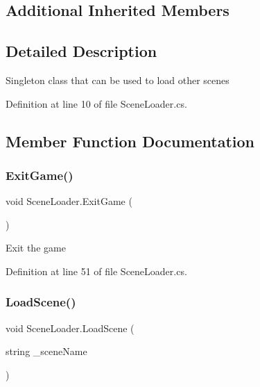 \subsection*{Additional Inherited Members}


\subsection{Detailed Description}
Singleton class that can be used to load other scenes 



Definition at line 10 of file Scene\+Loader.\+cs.



\subsection{Member Function Documentation}
\mbox{\label{class_scene_loader_a0e53114fa65d1ef71d1c6af0bcb4fde5}} 
\subsubsection{\texorpdfstring{Exit\+Game()}{ExitGame()}}
{\footnotesize\ttfamily void Scene\+Loader.\+Exit\+Game (\begin{DoxyParamCaption}{ }\end{DoxyParamCaption})}



Exit the game 



Definition at line 51 of file Scene\+Loader.\+cs.

\mbox{\label{class_scene_loader_a163293de6da9b9a1fd0f0814dec77973}} 
\subsubsection{\texorpdfstring{Load\+Scene()}{LoadScene()}\hspace{0.1cm}{\footnotesize\ttfamily [1/2]}}
{\footnotesize\ttfamily void Scene\+Loader.\+Load\+Scene (\begin{DoxyParamCaption}\item[{string}]{\+\_\+scene\+Name }\end{DoxyParamCaption})}



